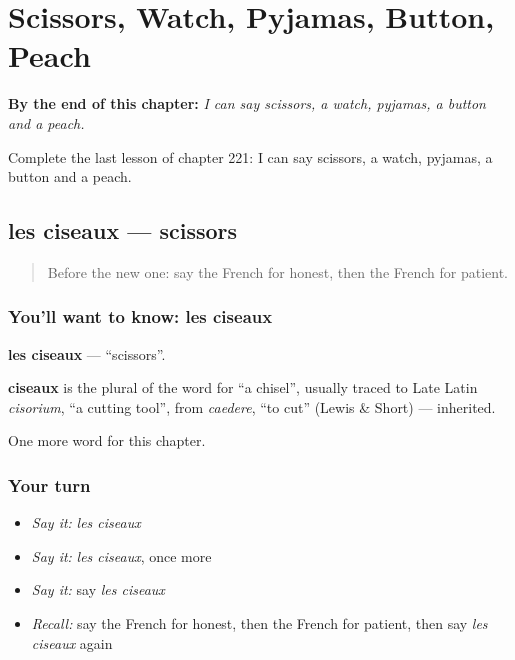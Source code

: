 
\chapter{Scissors, Watch, Pyjamas, Button, Peach}
\label{ch:fr-scissors-watch-pyjamas-button-peach}

\begin{chapteropening}
\textbf{By the end of this chapter:} \emph{I can say scissors, a watch, pyjamas, a button and a peach.}

Complete the last lesson of chapter 221: I can say scissors, a watch, pyjamas, a button and a peach.
\end{chapteropening}

\section[les ciseaux]{les ciseaux — scissors}

\label{lesson:FR-C221-ciseaux}



\begin{quote}
Before the new one: say the French for honest, then the French for patient.
\end{quote}

\subsection*{You'll want to know: les ciseaux}
\textbf{les ciseaux} — \textquotedblleft{}scissors\textquotedblright{}.

\begin{cousinweb}
\textbf{ciseaux} is the plural of the word for \textquotedblleft{}a chisel\textquotedblright{}, usually traced to Late Latin \emph{cisorium}, \textquotedblleft{}a cutting tool\textquotedblright{}, from \emph{caedere}, \textquotedblleft{}to cut\textquotedblright{} (Lewis \& Short) — inherited.
\end{cousinweb}

\begin{grammarlens}[title={What you've built}]
One more word for this chapter.
\end{grammarlens}

\subsection*{Your turn}
\begin{itemize}
\raggedright
  \item \emph{Say it:} \emph{les ciseaux}
  \item \emph{Say it:} \emph{les ciseaux}, once more
  \item \emph{Say it:} say \emph{les ciseaux}
  \item \emph{Recall:} say the French for honest, then the French for patient, then say \emph{les ciseaux} again
\end{itemize}


